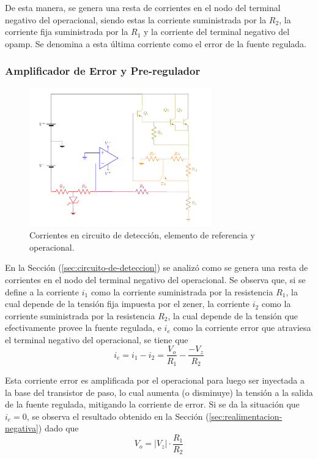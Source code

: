 De esta manera, se genera una resta de corrientes en el nodo del terminal negativo del operacional, siendo estas la corriente suministrada por la $R_2$, la corriente fija suministrada por la $R_1$ y la corriente del terminal negativo del opamp. Se denomina a esta última corriente como el error de la fuente regulada.

\subsubsection{Amplificador de Error y Pre-regulador}
\label{sec:amp-error}

\begin{figure}[H]
\centering
	\includegraphics[width=0.7\textwidth, page=8]{ImagenesEjercicio2/Regulador.pdf}
	\caption{Corrientes en circuito de detección, elemento de referencia y operacional.}
	\label{fig:amp-prereg-det-ref}
\end{figure}

En la Sección (\ref{sec:circuito-de-deteccion}) se analizó como se genera una resta de corrientes en el nodo del terminal negativo del operacional. Se observa que, si se define a la corriente $i_1$ como la corriente suministrada por la resistencia $R_1$, la cual depende de la tensión fija impuesta por el zener, la corriente $i_2$ como la corriente suministrada por la resistencia $R_2$, la cual depende de la tensión que efectivamente provee la fuente regulada, e $i_e$ como la corriente error que atraviesa el terminal negativo del operacional, se tiene que
\begin{equation}
	i_e = i_1 - i_2 = \frac{V_o}{R_1} - \frac{-V_z}{R_2}
\end{equation}

Esta corriente error es amplificada por el operacional para luego ser inyectada a la base del transistor de paso, lo cual aumenta (o disminuye) la tensión a la salida de la fuente regulada, mitigando la corriente de error. Si se da la situación que $i_e = 0$, se observa el resultado obtenido en la Sección (\ref{sec:realimentacion-negativa}) dado que
\begin{equation}
V_o = |V_z| \cdot \frac{R_1}{R_2}
\end{equation}

